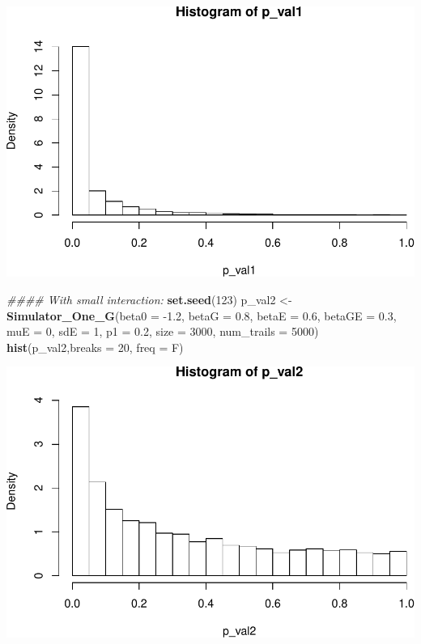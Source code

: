 \documentclass[]{article}
\newenvironment{Shaded}{\begin{snugshade}}{\end{snugshade}}
\newcommand{\CommentTok}[1]{\textcolor[rgb]{0.56,0.35,0.01}{\textit{#1}}}
\newcommand{\DataTypeTok}[1]{\textcolor[rgb]{0.13,0.29,0.53}{#1}}
\newcommand{\DecValTok}[1]{\textcolor[rgb]{0.00,0.00,0.81}{#1}}
\newcommand{\FloatTok}[1]{\textcolor[rgb]{0.00,0.00,0.81}{#1}}
\newcommand{\KeywordTok}[1]{\textcolor[rgb]{0.13,0.29,0.53}{\textbf{#1}}}
\newcommand{\NormalTok}[1]{#1}
\newcommand{\StringTok}[1]{\textcolor[rgb]{0.31,0.60,0.02}{#1}}
\begin{document}
\includegraphics{stats-gene-research-progress-v4_files/figure-latex/unnamed-chunk-1-2.pdf}

\begin{Shaded}
\begin{Highlighting}[]
\CommentTok{#### With small interaction:}
\KeywordTok{set.seed}\NormalTok{(}\DecValTok{123}\NormalTok{)}
\NormalTok{p_val2 <-}\StringTok{ }\KeywordTok{Simulator_One_G}\NormalTok{(}\DataTypeTok{beta0 =} \FloatTok{-1.2}\NormalTok{, }\DataTypeTok{betaG =} \FloatTok{0.8}\NormalTok{, }\DataTypeTok{betaE =} \FloatTok{0.6}\NormalTok{, }\DataTypeTok{betaGE =} \FloatTok{0.3}\NormalTok{, }\DataTypeTok{muE =} \DecValTok{0}\NormalTok{, }\DataTypeTok{sdE =} \DecValTok{1}\NormalTok{, }\DataTypeTok{p1 =} \FloatTok{0.2}\NormalTok{, }\DataTypeTok{size =} \DecValTok{3000}\NormalTok{, }\DataTypeTok{num_trails =} \DecValTok{5000}\NormalTok{)}
\KeywordTok{hist}\NormalTok{(p_val2,}\DataTypeTok{breaks =} \DecValTok{20}\NormalTok{, }\DataTypeTok{freq =}\NormalTok{ F)}
\end{Highlighting}
\end{Shaded}

\includegraphics{stats-gene-research-progress-v4_files/figure-latex/unnamed-chunk-1-3.pdf}
\end{document}
